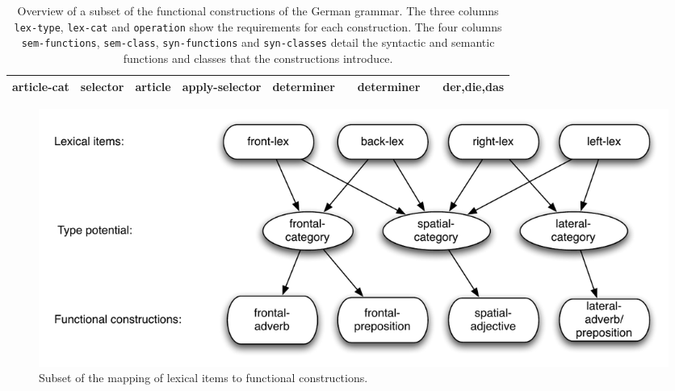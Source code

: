 \begin{table}
\begin{footnotesize}
\begin{tabular}{| p{1.5cm} || p{1.1cm} | p{1.45cm} || p{1.7cm} || p{1.9cm} | p{1.55cm} | p{1.45cm} | p{1.5cm} || p{1.9cm} |}
\\ \hline 
article-cat  &selector &article & apply-selector &determiner & &determiner & &der,die,das 
\\ \hline
\end{tabular}
\caption[Functional constructions]
{Overview of a subset of the functional constructions of the German grammar. 
The three columns {\footnotesize\tt lex-type},
{\footnotesize\tt lex-cat} and {\footnotesize\tt operation} show the requirements for each construction.
The four columns {\footnotesize\tt sem-functions}, {\footnotesize\tt sem-class}, {\footnotesize\tt syn-functions}
and {\footnotesize\tt syn-classes} detail the syntactic and semantic functions and classes that
the constructions introduce.}
\label{t:functional-constructions}
\end{footnotesize}
\end{table}



\begin{figure}
\includegraphics[width=\columnwidth]{figs/lexicals-type-potentials-cats}
\caption{Subset of the mapping of lexical items to functional constructions.}
\label{f:lexicals-type-potentials-cats}
\end{figure}

